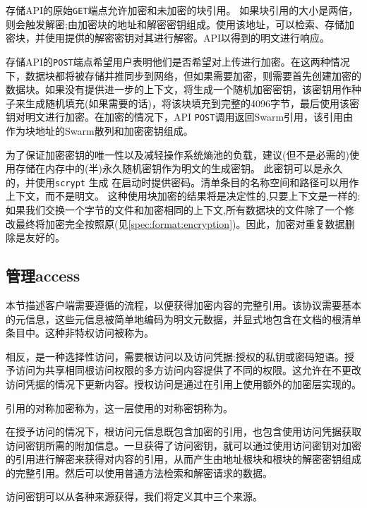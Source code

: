 
存储API的原始\lstinline{GET}端点允许加密和未加密的块引用。 
如果块引用的大小是两倍，则会触发解密;由加密块的地址和解密密钥组成。使用该地址，可以检索、存储加密块，并使用提供的解密密钥对其进行解密。API以得到的明文进行响应。

存储API的\lstinline{POST}端点希望用户表明他们是否希望对上传进行加密。在这两种情况下，数据块都将被存储并推同步到网络，但如果需要加密，则需要首先创建加密的数据块。如果没有提供进一步的上下文，将生成一个随机加密密钥，该密钥用作种子来生成随机填充(如果需要的话)，将该块填充到完整的4096字节，最后使用该密钥对明文进行加密。在加密的情况下，API \lstinline{POST}调用返回Swarm引用，该引用由作为块地址的Swarm散列和加密密钥组成。 

为了保证加密密钥的唯一性以及减轻操作系统熵池的负载，建议(但不是必需的)使用存储在内存中的(半)永久随机密钥作为明文的生成密钥。 
此密钥可以是永久的，并使用\lstinline{scrypt} \cite{percival2009stronger}生成
在启动时提供密码。清单条目的名称空间和路径可以用作上下文，而不是明文。
这种使用块加密的结果将是决定性的,只要上下文是一样的:如果我们交换一个字节的文件和加密相同的上下文,所有数据块的文件除了一个修改最终将加密完全按照原(见\ref{spec:format:encryption})。因此，加密对重复数据删除是友好的。 


\subsection{管理access\statusgreen}\label{sec:managing-access}

本节描述客户端需要遵循的流程，以便获得加密内容的完整引用。该协议需要基本的元信息，这些元信息被简单地编码为明文元数据，并显式地包含在文档的根清单条目中。这种非特权访问被称为。

相反，是一种选择性访问，需要根访问以及访问凭据:授权的私钥或密码短语。授予访问为共享相同根访问权限的多方访问内容提供了不同的权限。这允许在不更改访问凭据的情况下更新内容。授权访问是通过在引用上使用额外的加密层实现的。

引用的对称加密称为，这一层使用的对称密钥称为。

在授予访问的情况下，根访问元信息既包含加密的引用，也包含使用访问凭据获取访问密钥所需的附加信息。一旦获得了访问密钥，就可以通过使用访问密钥对加密的引用进行解密来获得对内容的引用，从而产生由地址根块和根块的解密密钥组成的完整引用。然后可以使用普通方法检索和解密请求的数据。

访问密钥可以从各种来源获得，我们将定义其中三个来源。

